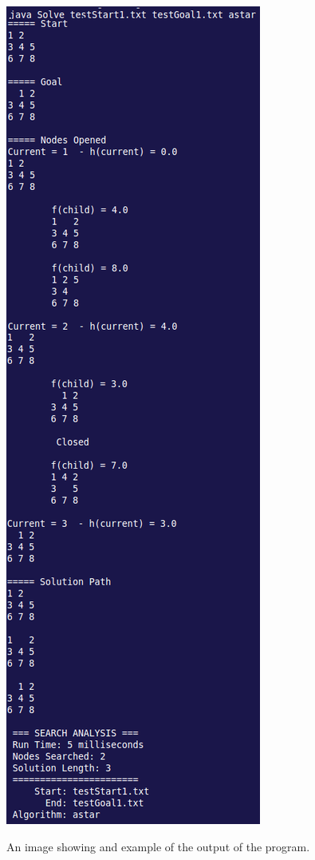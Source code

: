 \documentclass[12pt]{article}
\begin{document}
\begin{figure}
	\begin{center}
		\includegraphics[scale=0.4]{Images/example_output.png}
		\label{fig:examplerun}
		\caption{An image showing and example of the output of the program.}
		\vspace{-60pt}
	\end{center}
\end{figure}
\end{document}
